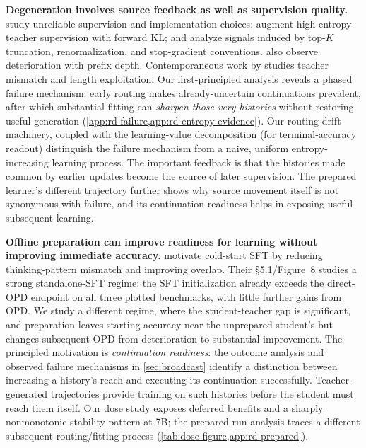 \noindent\textbf{Degeneration involves source feedback as well as supervision quality.}
\citet{fu2026revisitingonpolicydistillationempirical} study unreliable supervision and implementation choices; \citet{jin2026entropyawareonpolicydistillationlanguage} augment high-entropy teacher supervision with forward KL; and \citet{zhu2026manyfaces} analyze signals induced by top-$K$ truncation, renormalization, and stop-gradient conventions. \citet{rethinking_opd_2026} also observe deterioration with prefix depth. Contemporaneous work by \citet{wang2026demystifying} studies teacher mismatch and length exploitation. Our first-principled analysis reveals a phased failure mechanism: early routing makes already-uncertain continuations prevalent, after which substantial fitting can \emph{sharpen those very histories} without restoring useful generation (\cref{app:rd-failure,app:rd-entropy-evidence}). Our routing-drift machinery, coupled with the learning-value decomposition (for terminal-accuracy readout) distinguish the failure mechanism from a naive, uniform entropy-increasing learning process. The important feedback is that the histories made common by earlier updates become the source of later supervision. The prepared learner's different trajectory further shows why source movement itself is not synonymous with failure, and its continuation-readiness helps in exposing useful subsequent learning.

\noindent\textbf{Offline preparation can improve readiness for learning without improving immediate accuracy.}
\citet{rethinking_opd_2026} motivate cold-start SFT by reducing thinking-pattern mismatch and improving overlap. Their \S5.1/Figure~8 studies a strong standalone-SFT regime: the SFT initialization already exceeds the direct-OPD endpoint on all three plotted benchmarks, with little further gains from OPD. We study a different regime, where the student-teacher gap is significant, and preparation leaves starting accuracy near the unprepared student's but changes subsequent OPD from deterioration to substantial improvement. The principled motivation is \emph{continuation readiness}: the outcome analysis and observed failure mechanisms in \cref{sec:broadcast} identify a distinction between increasing a history's reach and executing its continuation successfully. Teacher-generated trajectories provide training on such histories before the student must reach them itself. Our dose study exposes deferred benefits and a sharply nonmonotonic stability pattern at 7B; the prepared-run analysis traces a different subsequent routing/fitting process (\cref{tab:dose-figure,app:rd-prepared}). 

